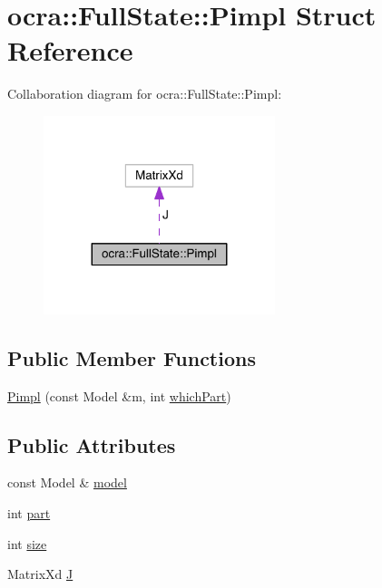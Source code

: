 \hypertarget{structocra_1_1FullState_1_1Pimpl}{}\section{ocra\+:\+:Full\+State\+:\+:Pimpl Struct Reference}
\label{structocra_1_1FullState_1_1Pimpl}


Collaboration diagram for ocra\+:\+:Full\+State\+:\+:Pimpl\+:\nopagebreak
\begin{figure}[H]
\begin{center}
\leavevmode
\includegraphics[width=191pt]{dc/d60/structocra_1_1FullState_1_1Pimpl__coll__graph}
\end{center}
\end{figure}
\subsection*{Public Member Functions}
\begin{DoxyCompactItemize}
\item 
\hyperlink{structocra_1_1FullState_1_1Pimpl_a0bede192675a41ae72485eacefca15ac}{Pimpl} (const Model \&m, int \hyperlink{classocra_1_1FullState_a75ec7c039df8cb8608ebf34f7b779be5}{which\+Part})
\end{DoxyCompactItemize}
\subsection*{Public Attributes}
\begin{DoxyCompactItemize}
\item 
const Model \& \hyperlink{structocra_1_1FullState_1_1Pimpl_ac8e2409d7e4a099fdb6fc3ef9c7d3026}{model}
\item 
int \hyperlink{structocra_1_1FullState_1_1Pimpl_ab10f6e199d008d84731024cb80772a5d}{part}
\item 
int \hyperlink{structocra_1_1FullState_1_1Pimpl_a5deca911251aa5b774b3cf7f3f6bd5d4}{size}
\item 
Matrix\+Xd \hyperlink{structocra_1_1FullState_1_1Pimpl_a150f47fa013614729e1e6aedf141523f}{J}
\end{DoxyCompactItemize}


